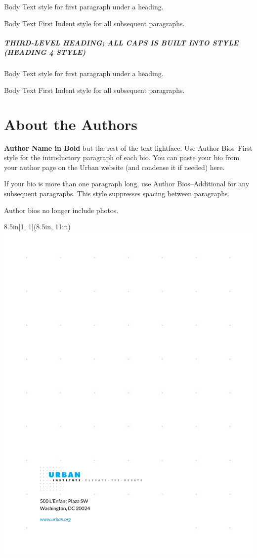 \documentclass{urban-formatting}
\begin{document}
Body Text style for first paragraph under a heading.

Body Text First Indent style for all subsequent paragraphs.


\subsubsection*{THIRD-LEVEL HEADING; ALL CAPS IS BUILT INTO STYLE (HEADING 4 STYLE)}

Body Text style for first paragraph under a heading.

Body Text First Indent style for all subsequent paragraphs.


\newpage
\part*{About the Authors}
\textbf{Author Name in Bold} but the rest of the text lightface. Use Author Bios--First style for the introductory paragraph of each bio. You can paste your bio from your author page on the Urban website (and condense it if needed) here. 

If your bio is more than one paragraph long, use Author Bios--Additional for any subsequent paragraphs. This style suppresses spacing between paragraphs.

Author bios no longer include photos.


\newpage
\thispagestyle{empty}

\begin{textblock*}{8.5in}[1, 1](8.5in, 11in)
    \noindent\includegraphics[width=\paperwidth,height=\paperheight]{images/back.pdf}
\end{textblock*}
\end{document}
